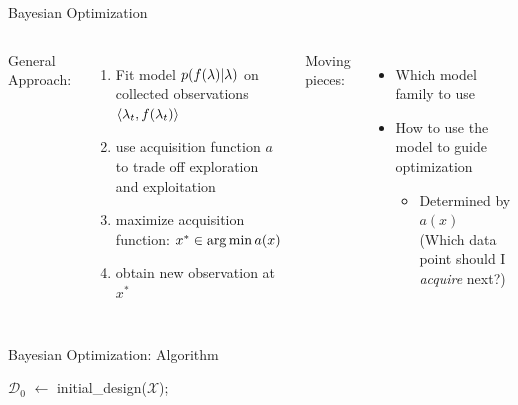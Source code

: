 \begin{frame}[c,fragile]{Bayesian Optimization }
\begin{columns}
General Approach:
\begin{enumerate}
  \item Fit model $p(f(\mathbf{\lambda}) | \mathbf{\lambda})$ on collected observations $\langle{}\mathbf{\lambda}_t, f(\mathbf{\lambda}_t)\rangle{}$
  \pause
  \item use acquisition function $a$ to trade off exploration and exploitation
  \pause
  \item maximize acquisition function: $x^* \in \operatorname*{arg\,min} a(x)$
  \pause
  \item obtain new observation at $x^*$
\end{enumerate}

\pause
Moving pieces:
\begin{itemize}
  	\item Which \alert{model family} to use 
	\item How to use the model to guide optimization
	\begin{itemize}
		\item Determined by $a(x)$\\
		(Which data point should I \emph{acquire} next?) 
	\end{itemize}
\end{itemize}

\end{columns}

\end{frame}
\begin{frame}[c,fragile]{Bayesian Optimization: Algorithm}

\begin{algorithm}[H]
	\BlankLine
	$\mathcal{D}_0$ $\leftarrow$ initial\_design($\mathcal{X}$); \\
	\For{n = $1, 2, \ldots m - |D_0|$}{
		$\surro: \conf \mapsto y$ $\leftarrow$ fit predictive model on $\mathcal{D}_{n-1}$;\\
		select $x_{n}$ by optimizing $x_{n} \in \argmax_{x \in \mathcal{X}} \alpha(x; \mathcal{D}_{n-1}, \surro)$;\\
		Query $y_{n} := f(x_{n})$;\\
		Add observation to data $D_{n} := D_{n-1} \cup \{\langle x_{n}, y_{n} \rangle \}$;\\
	}
	\caption{Bayesian Optimization (BO)}
\end{algorithm}


\end{frame}
